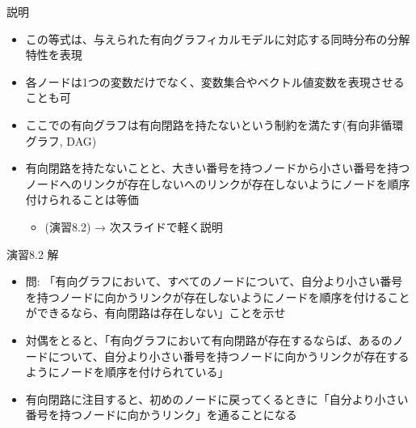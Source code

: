 \begin{frame}{説明}
 \begin{itemize}
  \item この等式は、与えられた有向グラフィカルモデルに対応する同時分布の分解特性を表現
  \item 各ノードは1つの変数だけでなく、変数集合やベクトル値変数を表現させることも可
  \item ここでの有向グラフは有向閉路を持たないという制約を満たす(有向非循環グラフ, DAG)
  \item 有向閉路を持たないことと、大きい番号を持つノードから小さい番号を持つノードへのリンクが存在しないへのリンクが存在しないようにノードを順序付けられることは等価
        \begin{itemize}
         \item (演習8.2) → 次スライドで軽く説明
        \end{itemize}
 \end{itemize}
\end{frame}

\begin{frame}{演習8.2 解}
 \begin{itemize}
  \item 問: 「有向グラフにおいて、すべてのノードについて、自分より小さい番号を持つノードに向かうリンクが存在しないようにノードを順序を付けることができるなら、有向閉路は存在しない」ことを示せ
  \item 対偶をとると、「有向グラフにおいて有向閉路が存在するならば、あるのノードについて、自分より小さい番号を持つノードに向かうリンクが存在するようにノードを順序を付けられている」
  \item 有向閉路に注目すると、初めのノードに戻ってくるときに「自分より小さい番号を持つノードに向かうリンク」を通ることになる
 \end{itemize}
\end{frame}
